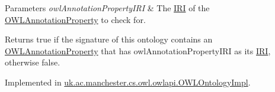 \begin{DoxyParams}{Parameters}
{\em owl\-Annotation\-Property\-I\-R\-I} & The \hyperlink{classorg_1_1semanticweb_1_1owlapi_1_1model_1_1_i_r_i}{I\-R\-I} of the \hyperlink{interfaceorg_1_1semanticweb_1_1owlapi_1_1model_1_1_o_w_l_annotation_property}{O\-W\-L\-Annotation\-Property} to check for. \\
\hline
\end{DoxyParams}
\begin{DoxyReturn}{Returns}
{\ttfamily true} if the signature of this ontology contains an \hyperlink{interfaceorg_1_1semanticweb_1_1owlapi_1_1model_1_1_o_w_l_annotation_property}{O\-W\-L\-Annotation\-Property} that has {\ttfamily owl\-Annotation\-Property\-I\-R\-I} as its \hyperlink{classorg_1_1semanticweb_1_1owlapi_1_1model_1_1_i_r_i}{I\-R\-I}, otherwise {\ttfamily false}. 
\end{DoxyReturn}


Implemented in \hyperlink{classuk_1_1ac_1_1manchester_1_1cs_1_1owl_1_1owlapi_1_1_o_w_l_ontology_impl_a651f5adee264a1b4311aafa7a43da96b}{uk.\-ac.\-manchester.\-cs.\-owl.\-owlapi.\-O\-W\-L\-Ontology\-Impl}.

